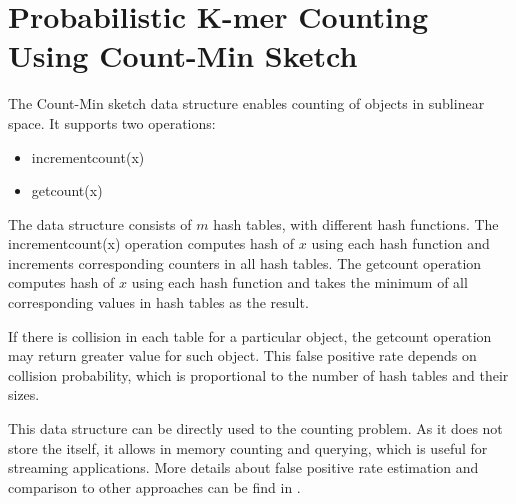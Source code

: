 \section{Probabilistic K-mer Counting Using Count-Min Sketch}

The Count-Min sketch\cite{countminsketch} data structure enables counting of objects in sublinear space. It supports two operations:
\begin{itemize}
  \item incrementcount(x)
  \item getcount(x)
\end{itemize}

The data structure consists of $m$ hash tables, with different hash functions.
The incrementcount(x) operation computes hash of $x$ using each hash function and increments corresponding counters in all hash tables. The getcount operation computes hash of $x$ using each hash function and takes the minimum of all corresponding values in hash tables as the result.

If there is collision in each table for a particular object, the getcount operation may return greater value for such object. This false positive rate depends on collision probability, which is proportional to the number of hash tables and their sizes.

This data structure can be directly used to the \kmer counting problem. As it does not store the \kmers itself, it allows in memory \kmer counting and querying, which is useful for streaming applications.
More details about false positive rate estimation and comparison to other approaches can be find in \cite{khmer}.


